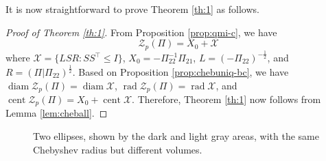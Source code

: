 \documentclass[pdflatex,sn-mathphys-num]{sn-jnl}%
\DeclareMathOperator{\rad}{rad}
\DeclareMathOperator{\cent}{cent}
\DeclareMathOperator{\diam}{diam}
\theoremstyle{thmstyleone}
\begin{document}
It is now straightforward to prove Theorem \ref{th:1} as follows. 

\begin{proof}[Proof of Theorem \ref{th:1}]
From Proposition \ref{prop:qmi-c}, we have
\begin{equation}
\mathcal{Z}_{p}(\Pi)=X_0+\mathcal{X}
\end{equation}
where $\mathcal{X}=\{LSR:SS^\top\leq I\}$, $X_0=-\Pi_{22}^{-1} \Pi_{21}$, $L=(-\Pi_{22})^{-\frac{1}{2}}$, and $R=(\Pi|\Pi_{22})^{\frac{1}{2}}$.
Based on Proposition \ref{prop:chebuniq-bc}, we have $\diam\mathcal{Z}_p(\Pi)=\diam\mathcal{X}$, $\rad\mathcal{Z}_p(\Pi)=\rad\mathcal{X}$, and \linebreak $\cent\mathcal{Z}_p(\Pi)=X_0+\cent\mathcal{X}$. Therefore, Theorem \ref{th:1}
now follows from Lemma \ref{lem:cheball}. 
\end{proof}

\begin{figure}[h]
    \centering
    \caption{Two ellipses, shown by the dark and light gray areas, with the same Chebyshev radius but different volumes.}
    \label{fig:2pp}
\end{figure}
\end{document}
